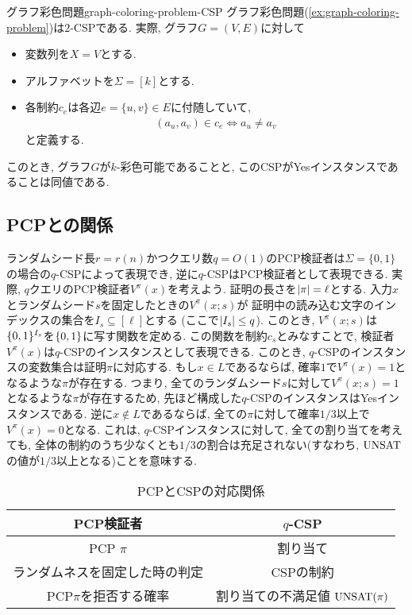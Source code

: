 \begin{example}{グラフ彩色問題}{graph-coloring-problem-CSP}
  グラフ彩色問題(\cref{ex:graph-coloring-problem})は$2$-CSPである.
  実際, グラフ$G=(V,E)$に対して
  \begin{itemize}
    \item 変数列を$X=V$とする.
    \item アルファベットを$\Sigma=[k]$とする.
    \item 各制約$c_e$は各辺$e=\{u,v\}\in E$に付随していて,
    \begin{align*}
      (a_u,a_v) \in c_e \iff a_u\ne a_v
    \end{align*}
  と定義する.
  \end{itemize}
  このとき, グラフ$G$が$k$-彩色可能であることと, このCSPがYesインスタンスであることは同値である.
\end{example}


\subsection{PCPとの関係}
ランダムシード長$r=r(n)$かつクエリ数$q=O(1)$のPCP検証者は$\Sigma=\{0,1\}$の場合の$q$-CSPによって表現でき, 逆に$q$-CSPはPCP検証者として表現できる.
実際, $q$クエリのPCP検証者$V^\pi(x)$を考えよう.
証明の長さを$\abs{\pi}=\ell$とする.
入力$x$とランダムシード$s$を固定したときの$V^\pi(x;s)$が
証明中の読み込む文字のインデックスの集合を$I_s\subseteq[\ell]$とする (ここで$\abs{I_s}\le q$).
このとき, $V^\pi(x;s)$は$\{0,1\}^{I_s}$を$\{0,1\}$に写す関数を定める.
この関数を制約$c_s$とみなすことで, 検証者$V^\pi(x)$は$q$-CSPのインスタンスとして表現できる.
このとき, $q$-CSPのインスタンスの変数集合は証明$\pi$に対応する.
もし$x\in L$であるならば, 確率$1$で$V^\pi(x)=1$となるような$\pi$が存在する.
つまり, 全てのランダムシード$s$に対して$V^\pi(x;s)=1$となるような$\pi$が存在するため,
先ほど構成した$q$-CSPのインスタンスはYesインスタンスである.
逆に$x\not\in L$であるならば, 全ての$\pi$に対して確率$1/3$以上で$V^\pi(x)=0$となる.
これは, $q$-CSPインスタンスに対して, 全ての割り当てを考えても, 全体の制約のうち少なくとも$1/3$の割合は充足されない(すなわち, $\mathrm{UNSAT}$の値が$1/3$以上となる)ことを意味する.


\begin{table}[htbp]
  \centering
  \begin{tabular}{|c|c|}
    \hline
    PCP検証者 & $q$-CSP \\
    \hline
    PCP $\pi$ & 割り当て \\
    \hline
    ランダムネスを固定した時の判定 & CSPの制約 \\
    \hline
    PCP$\pi$を拒否する確率 & 割り当ての不満足値 $\mathrm{UNSAT}(\pi)$ \\
    \hline
  \end{tabular}
  \caption{PCPとCSPの対応関係}
  \label{table:pcp-csp-correspondence}
\end{table}

